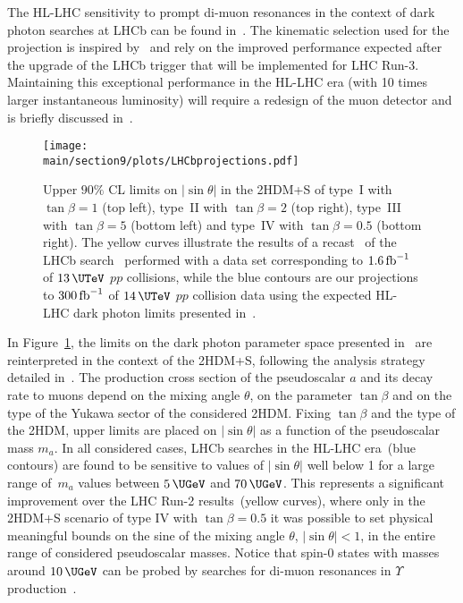 The HL-LHC sensitivity to prompt di-muon resonances in the context of dark photon searches at LHCb can be found in~\cite{Bediaga:2018lhg}. The kinematic selection used for the projection is inspired by~\cite{Ilten:2016tkc} and rely on the improved performance expected after the upgrade of the LHCb trigger that will be implemented for LHC Run-3. Maintaining this exceptional performance in the HL-LHC era (\ie with 10 times larger instantaneous luminosity) will require a redesign of the muon detector and is briefly discussed in~\cite{Bediaga:2018lhg}.

\begin{figure}[ht!]
\centering
\texttt{[image: \\main/section9/plots/LHCbprojections.pdf]}
\vspace{2mm}
\caption{Upper $90\%$ CL limits on $|\!\sin\theta|$ in the 2HDM+S of type~I with $\tan\beta =1$ (top left), type~II with $\tan\beta =2$ (top right), type~III with $\tan\beta = 5$ (bottom left) and type~IV with $\tan\beta = 0.5$ (bottom right). The yellow curves illustrate the results of a recast~\cite{Haisch:2018kqx} of the LHCb search~\cite{Aaij:2017rft} performed with a data set corresponding to $1.6\, {\rm fb}^{-1}$ of $13 \, {\rm \UTeV}$ $pp$ collisions, while the blue contours are our projections to $300 \, {\rm fb}^{-1}$ of $14 \, {\rm \UTeV}$ $pp$ collision data using the expected HL-LHC dark photon limits presented in~\cite{Bediaga:2018lhg}. }\label{fig:lhcb_lightmumu}
\end{figure}

In Figure~\ref{fig:lhcb_lightmumu}, the limits on the dark photon parameter space presented in~\cite{Bediaga:2018lhg} are reinterpreted in the context of the 2HDM+S, following the analysis strategy detailed in~\cite{Haisch:2018kqx}. The production cross section of the pseudoscalar $a$ and its decay rate to muons depend on the mixing angle $\theta$, on the parameter $\tan\beta$ and on the type of the Yukawa sector of the considered 2HDM. Fixing $\tan\beta$ and the type of the 2HDM, upper limits are placed on $|\!\sin\theta|$ as a function of the pseudoscalar mass $m_a$. In all considered cases, LHCb searches in the HL-LHC era~(blue contours) are found to be sensitive to values of $|\!\sin\theta|$ well below 1 for a large range of~$m_a$ values between $5 \, {\rm \UGeV}$ and $70 \, {\rm \UGeV}$. This represents a significant improvement over the LHC Run-2 results~(yellow curves), where only in the 2HDM+S scenario of type IV with $\tan \beta = 0.5$ it was possible to set physical meaningful bounds on the sine of the mixing angle $\theta$, \ie $|\!\sin\theta| < 1$, in the entire range of considered pseudoscalar masses. Notice that spin-0 states with masses around $10 \, {\rm \UGeV}$ can be probed by searches for di-muon resonances in $\Upsilon$ production~\cite{Haisch:2016hzu,Aaij:2018xpt}.
